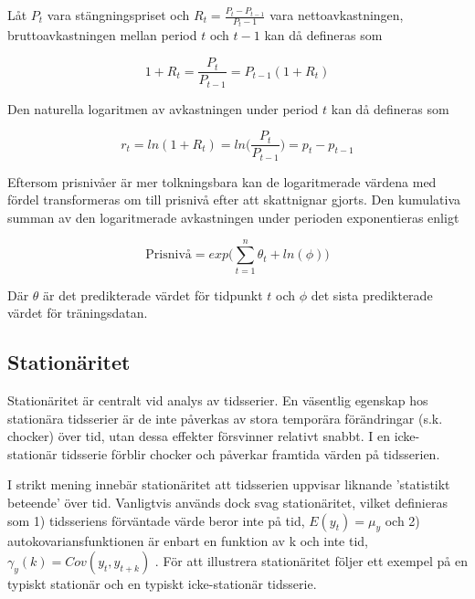 \documentclass[12pt]{article}
\begin{document}
Låt \(P_t\) vara stängningspriset och $R_{t}=\frac{P_{t} - P_{t-1}}{P_t-1}$ vara nettoavkastningen, bruttoavkastningen mellan period $t$ och $t-1$ kan då defineras som

\begin{equation*}
    1+R_{t} = \frac{P_{t}}{P_{t-1}} = P_{t-1}(1+R_{t})
\end{equation*}

Den naturella logaritmen av avkastningen under period $t$ kan då defineras som

\begin{equation*}
    r_{t}=ln(1 + R_{t})=ln\Big(\frac{P_{t}}{P_{t-1}}\Big)=p_{t}-p_{t-1}
\end{equation*}

Eftersom prisnivåer är mer tolkningsbara kan de logaritmerade värdena med fördel transformeras om till prisnivå efter att skattnignar gjorts. Den kumulativa summan av den logaritmerade avkastningen under perioden exponentieras enligt

\begin{equation*}
    \text{Prisnivå} =  exp\Big({\sum\limits_{t=1}^n \theta_{t}} + ln(\phi)\Big)
\end{equation*}

Där  $\theta$ är det predikterade värdet för tidpunkt $t$ och $\phi$ det sista predikterade värdet för träningsdatan. 






\subsection{Stationäritet}
Stationäritet är centralt vid analys av tidsserier. En väsentlig egenskap hos stationära tidsserier är de inte påverkas av stora temporära förändringar (s.k. chocker) över tid, utan dessa effekter försvinner relativt snabbt. I en icke-stationär tidsserie förblir chocker och påverkar framtida värden på tidsserien. \par
I strikt mening innebär stationäritet att tidsserien uppvisar liknande 'statistikt beteende' över tid. Vanligtvis används dock svag stationäritet, vilket definieras som 1) tidsseriens förväntade värde beror inte på tid, \(E(y_t)=\mu_y\) och 2) autokovariansfunktionen är enbart en funktion av k och inte tid, \(\gamma_y(k) = Cov(y_t, y_{t+k})\) \parencite{montgomery2015forecasting}. För att illustrera stationäritet följer ett exempel på en typiskt stationär och en typiskt icke-stationär tidsserie.
\end{document}
